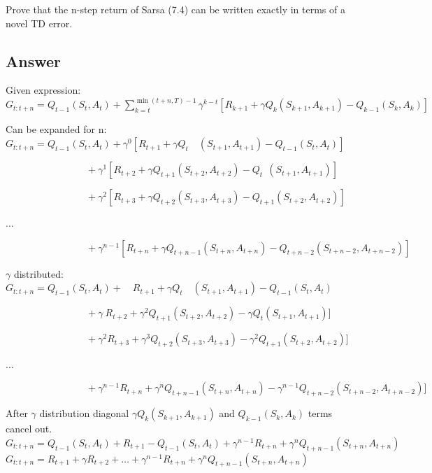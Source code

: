 \documentclass[11pt]{article}
\begin{document}
    Prove that the n-step return of Sarsa (7.4) can be written exactly in terms of a novel TD error.

    \subsection*{Answer}

    Given expression:
    \newline
    $ G_{t:t+n} = Q_{t-1}(S_t , A_t) + \sum_{ k=t}^{\min(t+n, T) - 1} \gamma^{k-t} [R_{k+1} + \gamma Q_{k}(S_{k+1} , A_{k+1}) - Q_{k-1}(S_{k} , A_{k}) ]  $
    \newline

    Can be expanded for n:
    \newline
    $ G_{t:t+n} = Q_{t-1}(S_t , A_t) + \gamma^{0} [R_{t+1} + \gamma Q_{t}\quad(S_{t+1} , A_{t+1}) - Q_{t-1}(S_{t} , A_{t}) ] $

    $  \qquad\qquad\qquad\qquad\  + \gamma^{1} [R_{t+2} + \gamma Q_{t+1}(S_{t+2} , A_{t+2}) - Q_{t}\ \ (S_{t+1} , A_{t+1}) ] $

    $  \qquad\qquad\qquad\qquad\  + \gamma^{2} [R_{t+3} + \gamma Q_{t+2}(S_{t+3} , A_{t+3}) - Q_{t+1}(S_{t+2} , A_{t+2}) ] $

    $ \dots $

     $  \qquad\qquad\qquad\qquad\  + \gamma^{n-1} [R_{t+n} + \gamma Q_{t+n-1}(S_{t+n} , A_{t+n}) - Q_{t+n-2}(S_{t+n-2} , A_{t+n-2}) ] $

    $\gamma$ distributed:
     \newline
    $ G_{t:t+n} = Q_{t-1}(S_t , A_t) + \quad R_{t+1} + \gamma Q_{t}\quad(S_{t+1} , A_{t+1}) - Q_{t-1}(S_{t} , A_{t})  $

    $  \qquad\qquad\qquad\qquad\  + \gamma \ R_{t+2} + \gamma^2 Q_{t+1}(S_{t+2} , A_{t+2}) - \gamma Q_{t}(S_{t+1} , A_{t+1}) ] $

    $  \qquad\qquad\qquad\qquad\  + \gamma^{2} R_{t+3} + \gamma^{3} Q_{t+2}(S_{t+3} , A_{t+3}) - \gamma^{2} Q_{t+1}(S_{t+2} , A_{t+2}) ] $

    $ \dots $

     $  \qquad\qquad\qquad\qquad\  + \gamma^{n-1} R_{t+n} + \gamma^{n} Q_{t+n-1}(S_{t+n} , A_{t+n}) - \gamma^{n-1} Q_{t+n-2}(S_{t+n-2} , A_{t+n-2}) ] $

    After $\gamma$ distribution diagonal $\gamma Q_{k}(S_{k+1} , A_{k+1}) $ and $ Q_{k-1}(S_{k} , A_{k}) $ terms cancel out.
    \newline
    $ G_{t:t+n} = Q_{t-1}(S_t , A_t) + R_{t+1} - Q_{t-1}(S_{t} , A_{t}) + \gamma^{n-1} R_{t+n} + \gamma^{n} Q_{t+n-1}(S_{t+n} , A_{t+n}) $
    \newline
    $ G_{t:t+n} = R_{t+1} + \gamma R_{t+2} + \dots + \gamma^{n-1} R_{t+n} + \gamma^{n} Q_{t+n-1}(S_{t+n} , A_{t+n}) $
    \newline
\end{document}
